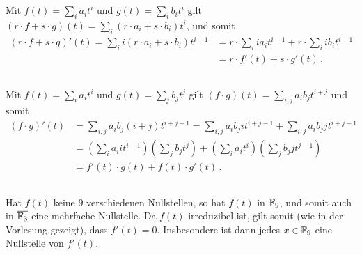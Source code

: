 \section{}





\subsection{}

Mit $f(t) = \sum_i a_i t^i$ und $g(t) = \sum_i b_i t^i$ gilt $(r \cdot f + s \cdot g)(t) = \sum_i (r \cdot a_i + s \cdot b_i) t^i$, und somit
\begin{align*}
      (r \cdot f + s \cdot g)'(t)
   =  \sum_i i (r \cdot a_i + s \cdot b_i) t^{i-1}
  &=  r \cdot \sum_i i a_i t^{i-1} + r \cdot \sum_i i b_i t^{i-1}
  \\
  &=  r \cdot f'(t) + s \cdot g'(t) \,.
\end{align*}





\subsection{}

Mit $f(t) = \sum_i a_i t^i$ und $g(t) = \sum_j b_j t^j$ gilt $(f \cdot g)(t) = \sum_{i,j} a_i b_j t^{i+j}$ und somit
\begin{align*}
      (f \cdot g)'(t)
  &=  \sum_{i,j} a_i b_j (i+j) t^{i+j-1}
   =  \sum_{i,j} a_i b_j i t^{i+j-1}
    + \sum_{i,j} a_i b_j j t^{i+j-1}
  \\
  &=  \left( \sum_i a_i i t^{i-1} \right) \left( \sum_j b_j t^j \right)
    + \left( \sum_i a_i t^i \right) \left( \sum_j b_j j t^{j-1} \right)
  \\
  &= f'(t) \cdot g(t) + f(t) \cdot g'(t) \,.
\end{align*}





\subsection{}

Hat $f(t)$ keine $9$ verschiedenen Nullstellen, so hat $f(t)$ in $\mathbb{F}_{9}$, und somit auch in $\overline{\mathbb{F}_{3}}$ eine mehrfache Nullstelle.
Da $f(t)$ irreduzibel ist, gilt somit (wie in der Vorlesung gezeigt), dass $f'(t) = 0$.
Insbesondere ist dann jedes $x \in \mathbb{F}_{9}$ eine Nullstelle von $f'(t)$.





